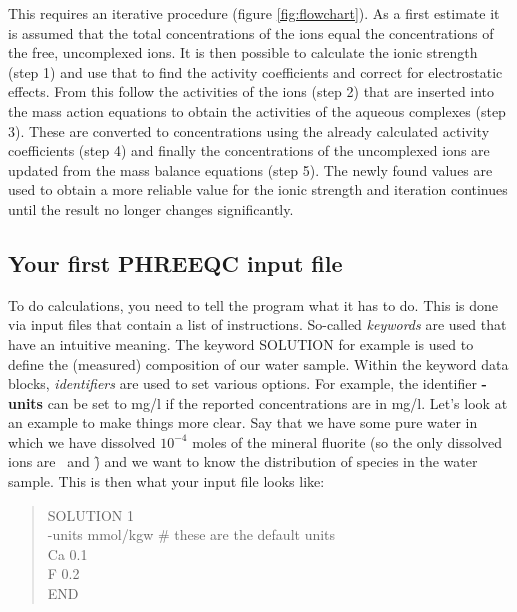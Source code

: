 This requires an iterative procedure (figure \ref{fig:flowchart}). As a first estimate it is assumed that the total concentrations of the ions equal the concentrations of the free, uncomplexed ions. It is then possible to calculate the ionic strength (step 1) and use that to find the activity coefficients and correct for electrostatic effects. From this follow the activities of the ions (step 2) that are inserted into the mass action equations to obtain the activities of the aqueous complexes (step 3). These are converted to concentrations using the already calculated activity coefficients (step 4) and finally the concentrations of the uncomplexed ions are updated from the mass balance equations (step 5). The newly found values are used to obtain a more reliable value for the ionic strength and iteration continues until the result no longer changes significantly.

\newpage

\subsection{Your first PHREEQC input file}
To do calculations, you need to tell the program what it has to do. This is done via input files that
contain a list of instructions. So-called \textit{keywords} are used that have an intuitive meaning. The keyword
SOLUTION for example is used to define the (measured) composition of our water sample. Within
the keyword data blocks, \textit{identifiers} are used to set various options. For example, the identifier \textbf{-units}
can be set to mg/l if the reported concentrations are in mg/l.
Let's look at an example to make things more clear. Say that we have some pure water in which we
have dissolved $10^{-4}$ moles of the mineral fluorite (so the only dissolved ions are \ca\ and \f) and we want to know
the distribution of species in the water sample. This is then what your input file looks like:

\begin{quote}
SOLUTION 1 \\
-units mmol/kgw \# these are the default units \\
Ca 0.1 \\
F 0.2 \\
END \\
\end{quote}

